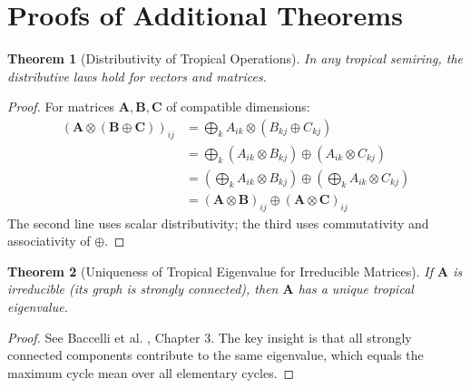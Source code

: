 \documentclass[11pt,a4paper]{article}
\theoremstyle{plain}
\newtheorem{theorem}{Theorem}[section]
\theoremstyle{definition}
\newcommand{\mat}[1]{\mathbf{#1}}
\begin{document}
\section{Proofs of Additional Theorems}
\label{app:proofs}

\begin{theorem}[Distributivity of Tropical Operations]
In any tropical semiring, the distributive laws hold for vectors and matrices.
\end{theorem}

\begin{proof}
For matrices $\mat{A}, \mat{B}, \mat{C}$ of compatible dimensions:
\begin{align*}
    (\mat{A} \otimes (\mat{B} \oplus \mat{C}))_{ij} &= \bigoplus_k A_{ik} \otimes (B_{kj} \oplus C_{kj}) \\
    &= \bigoplus_k (A_{ik} \otimes B_{kj}) \oplus (A_{ik} \otimes C_{kj}) \\
    &= \left(\bigoplus_k A_{ik} \otimes B_{kj}\right) \oplus \left(\bigoplus_k A_{ik} \otimes C_{kj}\right) \\
    &= (\mat{A} \otimes \mat{B})_{ij} \oplus (\mat{A} \otimes \mat{C})_{ij}
\end{align*}
The second line uses scalar distributivity; the third uses commutativity and associativity of $\oplus$.
\end{proof}

\begin{theorem}[Uniqueness of Tropical Eigenvalue for Irreducible Matrices]
If $\mat{A}$ is irreducible (its graph is strongly connected), then $\mat{A}$ has a unique tropical eigenvalue.
\end{theorem}

\begin{proof}
See Baccelli et al. \cite{baccelli1992synchronization}, Chapter 3. The key insight is that all strongly connected components contribute to the same eigenvalue, which equals the maximum cycle mean over all elementary cycles.
\end{proof}
\end{document}
